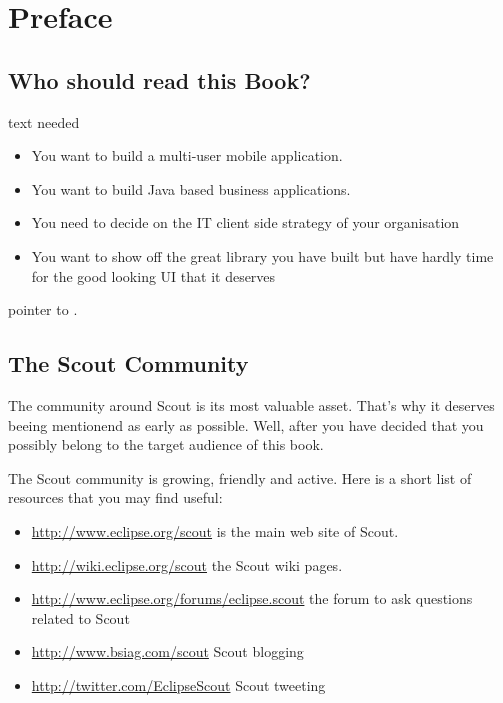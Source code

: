 \documentclass[a4paper,10pt,twoside]{book}
\begin{document}
  \sloppy
\fi


\chapter{Preface}


\section*{Who should read this Book?}

text needed

\begin{itemize}
\item You want to build a multi-user mobile application.
\item You want to build Java based business applications. 
\item You need to decide on the IT client side strategy of your organisation
\item You want to show off the great library you have built but have hardly time for the good looking UI that it deserves
\end{itemize}

pointer to .

\section*{The Scout Community}

The community around Scout is its most valuable asset. That's why it deserves 
beeing mentionend as early as possible. Well, after you have decided that 
you possibly belong to the target audience of this book.

The Scout community is growing, friendly and active.
Here is a short list of resources that you may find useful:

\begin{itemize}
\item \url{http://www.eclipse.org/scout} is the main web site of Scout.
\item \url{http://wiki.eclipse.org/scout} the Scout wiki pages.
\item \url{http://www.eclipse.org/forums/eclipse.scout} the forum to ask questions related to Scout
\item \url{http://www.bsiag.com/scout} Scout blogging
\item \url{http://twitter.com/EclipseScout} Scout tweeting
\end{itemize}
\end{document}
